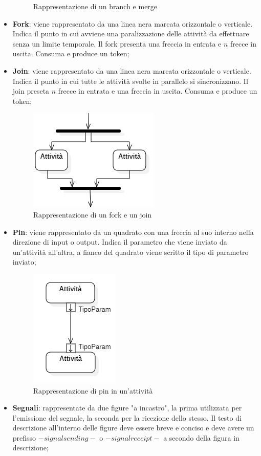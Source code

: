 \begin{itemize}
\begin{figure}[H]
		\caption{Rappresentazione di un branch e merge}
	\end{figure}
	\item \textbf{Fork}: viene rappresentato da una linea nera marcata orizzontale o verticale. Indica il punto in cui avviene una paralizzazione delle attività da effettuare senza un limite temporale. Il fork presenta una freccia in entrata e $n$ frecce in uscita. Consuma e produce un token;
	\item \textbf{Join}: viene rappresentato da una linea nera marcata orizzontale o verticale. Indica il punto in cui tutte le attività svolte in parallelo si sincronizzano. Il join preseta $n$ frecce in entrata e una freccia in uscita. Consuma e produce un token;
		\begin{figure}[H]
		\centering\includegraphics{../immagini/normeUML/forkJoin.png}
		\caption{Rappresentazione di un fork e un join}
	\end{figure}
	\item \textbf{Pin}: viene rappresentato da un quadrato con una freccia al suo interno nella direzione di input o output. Indica il parametro che viene inviato da un'attività all'altra, a fianco del quadrato viene scritto il tipo di parametro inviato;
		\begin{figure}[H]
		\centering\includegraphics{../immagini/normeUML/pin.png}
		\caption{Rappresentazione di pin in un'attività}
	\end{figure}
	\item \textbf{Segnali}: rappresentate da due figure "a incastro", la prima utilizzata per l'emissione del segnale, la seconda per la ricezione dello stesso. Il testo di descrizione all'interno delle figure deve essere breve e conciso e deve avere un prefisso $-signal sending-$ o $-signal receipt-$ a secondo della figura in descrizione;

\end{itemize}
